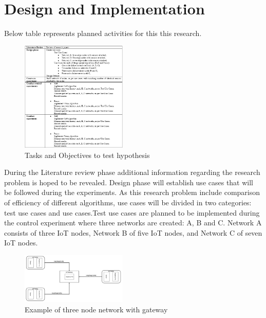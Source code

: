 \documentclass[	DIV=calc,%
							paper=a4,%
							fontsize=11pt,%
							twocolumn]{scrartcl}	 				%
\begin{document}
\section{Design and Implementation}
Below table represents planned activities for this this research.   
\begin{figure}[H]
\centering
\includegraphics[width=0.45\textwidth]{images/taskAndObj.png}
\caption{Tasks and Objectives to test hypothesis}
\end{figure}
\noindent During the Literature review phase additional information regarding the research problem is hoped to be revealed. Design phase will establish use cases that will be followed during the experiments. As this research problem include comparison of efficiency of different algorithms, use cases will be divided in two categories: test use cases and use cases.\smallskip \newline Test use cases are planned to be implemented during the control experiment where three networks are created: A, B and C. Network A consists of three IoT nodes, Network B of five IoT nodes, and Network C of seven IoT nodes.
\begin{figure}[H]
\centering
\includegraphics[width=0.45\textwidth]{images/arch_diagram.PNG}
\caption{Example of three node network with gateway}
\end{figure}
\end{document}

